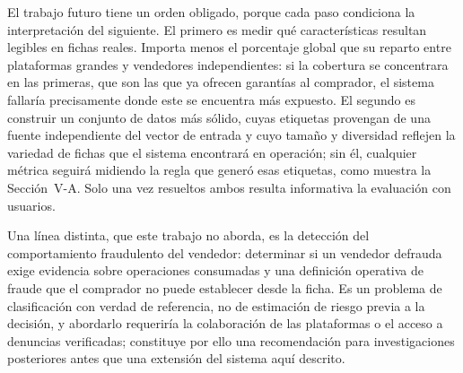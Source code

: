 El trabajo futuro tiene un orden obligado, porque cada paso condiciona la interpretación del
siguiente. El primero es medir qué características resultan legibles en fichas reales. Importa
menos el porcentaje global que su reparto entre plataformas grandes y vendedores
independientes: si la cobertura se concentrara en las primeras, que son las que ya ofrecen
garantías al comprador, el sistema fallaría precisamente donde este se encuentra más expuesto.
El segundo es construir un conjunto de datos más sólido, cuyas etiquetas provengan de una
fuente independiente del vector de entrada y cuyo tamaño y diversidad reflejen la variedad de
fichas que el sistema encontrará en operación; sin él, cualquier métrica seguirá midiendo la
regla que generó esas etiquetas, como muestra la Sección~V-A. Solo una vez resueltos ambos resulta
informativa la evaluación con usuarios.

Una línea distinta, que este trabajo no aborda, es la detección del comportamiento fraudulento
del vendedor: determinar si un vendedor defrauda exige evidencia sobre operaciones consumadas
y una definición operativa de fraude que el comprador no puede establecer desde la ficha. Es
un problema de clasificación con verdad de referencia, no de estimación de riesgo previa a la
decisión, y abordarlo requeriría la colaboración de las plataformas o el acceso a denuncias
verificadas; constituye por ello una recomendación para investigaciones posteriores antes que
una extensión del sistema aquí descrito.
